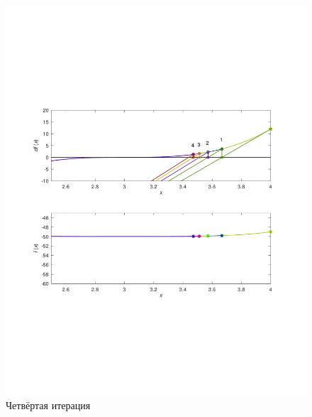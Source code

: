 \documentclass[a4paper,12pt]{article}
\begin{document}
    \begin{figure}[H]
        \centering
        \includegraphics[scale=0.4]{4secantitter.pdf}
        \caption{Четвёртая итерация}
    \end{figure}
\end{document}
